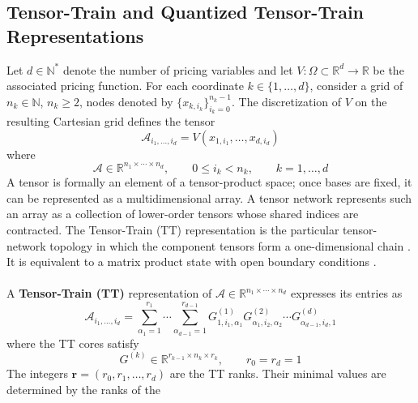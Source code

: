 \documentclass{article}
\numberwithin{equation}{subsection}
\theoremstyle{definition}
\theoremstyle{remark}
\begin{document}
\subsection{Tensor-Train and Quantized Tensor-Train Representations}
\label{subsec:tt-qtt}
Let \(d\in\mathbb{N}^{*}\) denote the number of pricing variables and let
\(V:\Omega\subset\mathbb{R}^{d}\to\mathbb{R}\) be the associated pricing function.
For each coordinate \(k\in\{1,\ldots,d\}\), consider a grid of
\(n_k\in\mathbb{N}\), \(n_k\geq 2\), nodes denoted by
\(\{x_{k,i_k}\}_{i_k=0}^{n_k-1}\).
The discretization of \(V\) on the resulting Cartesian grid defines the tensor
\begin{equation}
\mathcal{A}_{i_1,\ldots,i_d}
=
V\!\left(
x_{1,i_1},\ldots,x_{d,i_d}
\right)
\end{equation}
where
\begin{equation}
\mathcal{A}\in\mathbb{R}^{n_1\times\cdots\times n_d},
\qquad
0\leq i_k<n_k,
\qquad
k=1,\ldots,d
\end{equation}
A tensor is formally an element of a tensor-product space; once bases are fixed,
it can be represented as a multidimensional array. A tensor network represents
such an array as a collection of lower-order tensors whose shared indices are
contracted. The Tensor-Train (TT) representation is the particular tensor-network
topology in which the component tensors form a one-dimensional chain
\cite{oseledets2011tensorTrain}. It is equivalent to a matrix product state with
open boundary conditions \cite{orus2014tensorNetworks}.\\
\\
A \textbf{Tensor-Train (TT)} representation of
\(\mathcal{A}\in\mathbb{R}^{n_1\times\cdots\times n_d}\)
expresses its entries as
\begin{equation}
\mathcal{A}_{i_1,\ldots,i_d}
=
\sum_{\alpha_1=1}^{r_1}
\cdots
\sum_{\alpha_{d-1}=1}^{r_{d-1}}
G^{(1)}_{1,i_1,\alpha_1}
G^{(2)}_{\alpha_1,i_2,\alpha_2}
\cdots
G^{(d)}_{\alpha_{d-1},i_d,1}
\end{equation}
where the TT cores satisfy
\begin{equation}
G^{(k)}
\in
\mathbb{R}^{r_{k-1}\times n_k\times r_k},
\qquad
r_0=r_d=1
\end{equation}
The integers
\(\boldsymbol{r}=(r_0,r_1,\ldots,r_d)\)
are the TT ranks. Their minimal values are determined by the ranks of the
\end{document}
